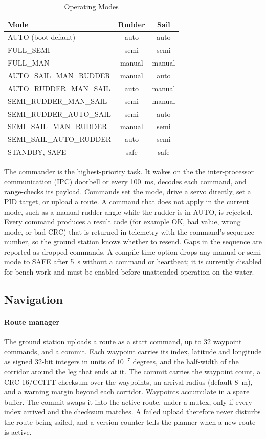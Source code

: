 \begin{table}[!t]
\caption{Operating Modes}
\label{tab:modes}
\centering
\begin{tabular}{@{}lcc@{}}
\toprule
Mode & Rudder & Sail \\
\midrule
AUTO (boot default)       & auto   & auto \\
FULL\_SEMI                & semi   & semi \\
FULL\_MAN                 & manual & manual \\
AUTO\_SAIL\_MAN\_RUDDER   & manual & auto \\
AUTO\_RUDDER\_MAN\_SAIL   & auto   & manual \\
SEMI\_RUDDER\_MAN\_SAIL   & semi   & manual \\
SEMI\_RUDDER\_AUTO\_SAIL  & semi   & auto \\
SEMI\_SAIL\_MAN\_RUDDER   & manual & semi \\
SEMI\_SAIL\_AUTO\_RUDDER  & auto   & semi \\
STANDBY, SAFE             & safe   & safe \\
\bottomrule
\end{tabular}
\end{table}

The commander is the highest-priority task. It wakes on the the inter-processor communication (IPC) doorbell or
every \SI{100}{\milli\second}, decodes each command, and range-checks its
payload. Commands set the mode, drive a servo directly, set a PID target, or
upload a route. A command that does not apply in the current mode, such as a
manual rudder angle while the rudder is in AUTO, is rejected. Every command
produces a result code (for example OK, bad value, wrong mode, or bad CRC) that
is returned in telemetry with the command's sequence number, so the ground
station knows whether to resend. Gaps in the sequence are reported as dropped
commands. A compile-time option drops any manual or semi mode to SAFE after
\SI{5}{\second} without a command or heartbeat; it is currently disabled for
bench work and must be enabled before unattended operation on the water.

\subsection{Navigation}
\paragraph*{Route manager}
The ground station uploads a route as a start command, up to 32 waypoint
commands, and a commit. Each waypoint carries its index, latitude and
longitude as signed 32-bit integers in units of $10^{-7}$ degrees, and the
half-width of the corridor around the leg that ends at it. The commit carries
the waypoint count, a CRC-16/CCITT checksum over the waypoints, an arrival
radius (default \SI{8}{\meter}), and a warning margin beyond each corridor.
Waypoints accumulate in a spare buffer. The commit swaps it into the active
route, under a mutex, only if every index arrived and the checksum matches. A
failed upload therefore never disturbs the route being sailed, and a version
counter tells the planner when a new route is active.

